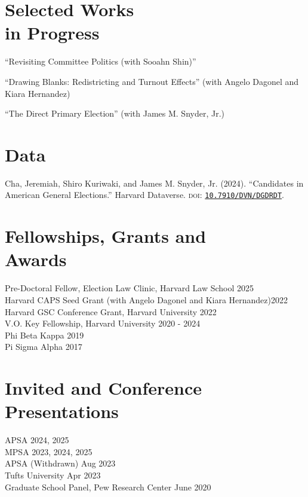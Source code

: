 \documentclass[margin, line]{res}
\begin{document}
\begin{resume}
\section{Selected Works \\in Progress}
\begin{etaremune}
	\item ``Revisiting Committee Politics (with Sooahn Shin)''
	\item ``Drawing Blanks: Redistricting and Turnout Effects'' (with Angelo Dagonel and Kiara Hernandez)
	\item ``The Direct Primary Election'' (with James M. Snyder, Jr.)
\end{etaremune}

\section{Data}
\begin{etaremune}
	\item Cha, Jeremiah, Shiro Kuriwaki, and James M. Snyder, Jr. (2024). ``Candidates in American General Elections.'' Harvard Dataverse. \textsc{doi}: \href{https://doi.org/10.7910/DVN/DGDRDT}{\texttt{10.7910/DVN/DGDRDT}}.
\end{etaremune}

\section{Fellowships, Grants and \\Awards}
Pre-Doctoral Fellow, Election Law Clinic, Harvard Law School \hfill 2025\\
Harvard CAPS Seed Grant (with Angelo Dagonel and Kiara Hernandez)\hfill 2022\\
Harvard GSC Conference Grant, Harvard University \hfill 2022\\
V.O. Key Fellowship, Harvard University \hfill 2020 - 2024\\
Phi Beta Kappa \hfill 2019\\
Pi Sigma Alpha \hfill 2017

\section{Invited and Conference Presentations}
APSA \hfill 2024, 2025\\
MPSA \hfill 2023, 2024, 2025\\
APSA (Withdrawn) \hfill Aug 2023\\
Tufts University \hfill Apr 2023\\
Graduate School Panel, Pew Research Center  \hfill June 2020


\end{resume}
\end{document}
